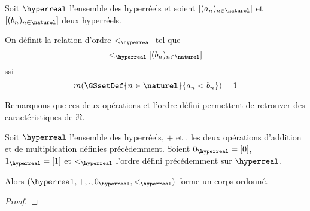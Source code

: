 \documentclass[a4paper, 12pt]{report}
\begin{document}
\begin{definition}
	Soit $\hyperreal$ l'ensemble des hyperréels et soient $[(a_{n})_{n \in
	\naturel}]$ et $[(b_{n})_{n \in \naturel}]$ deux hyperréels.

	On définit la relation d'ordre $<_{\hyperreal}$ tel que
	\begin{equation}
		[(a_{n})_{n \in \naturel}] <_{\hyperreal} [(b_{n})_{n \in \naturel}]
	\end{equation}
	ssi
	\begin{equation}
		m(\GSsetDef{n \in \naturel}{a_{n} < b_{n}}) = 1
	\end{equation}
\end{definition}

Remarquons que ces deux opérations et l'ordre défini permettent de retrouver des
caractéristiques de $\real$.

\begin{proposition}
	Soit $\hyperreal$ l'ensemble des hyperréels, $+$ et $.$ les deux opérations
	d'addition et de multiplication définies précédemment.
	Soient $0_{\hyperreal} = [0]$, $1_{\hyperreal} = [1]$ et $<_{\hyperreal}$
	l'ordre défini précédemment sur $\hyperreal$.

	Alors $(\hyperreal, +, ., 0_{\hyperreal}, <_{\hyperreal})$ forme un corps
	ordonné.
\end{proposition}

\ifdefined\outputproof
\begin{proof}

\end{proof}
\fi
\end{document}
